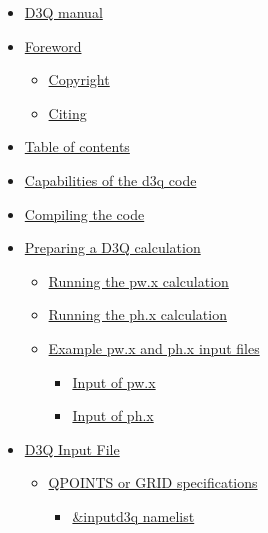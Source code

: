 \documentclass[
]{article}
\providecommand{\tightlist}{%
  \setlength{\itemsep}{0pt}\setlength{\parskip}{0pt}}
\begin{document}
\begin{itemize}
\tightlist
\item
  \protect\hyperlink{d3q-manual}{D3Q manual}
\item
  \protect\hyperlink{foreword}{Foreword}

  \begin{itemize}
  \tightlist
  \item
    \protect\hyperlink{copyright}{Copyright}
  \item
    \protect\hyperlink{citing}{Citing}
  \end{itemize}
\item
  \protect\hyperlink{table-of-contents}{Table of contents}
\item
  \protect\hyperlink{capabilities-of-the-d3q-code}{Capabilities of the
  d3q code}
\item
  \protect\hyperlink{compiling-the-code}{Compiling the code}
\item
  \protect\hyperlink{preparing-a-d3q-calculation}{Preparing a D3Q
  calculation}

  \begin{itemize}
  \tightlist
  \item
    \protect\hyperlink{running-the-pwx-calculation}{Running the pw.x
    calculation}
  \item
    \protect\hyperlink{running-the-phx-calculation}{Running the ph.x
    calculation}
  \item
    \protect\hyperlink{example-pwx-and-phx-input-files}{Example pw.x and
    ph.x input files}

    \begin{itemize}
    \tightlist
    \item
      \protect\hyperlink{input-of-pwx}{Input of pw.x}
    \item
      \protect\hyperlink{input-of-phx}{Input of ph.x}
    \end{itemize}
  \end{itemize}
\item
  \protect\hyperlink{d3q-input-file}{D3Q Input File}

  \begin{itemize}
  \tightlist
  \item
    \protect\hyperlink{qpoints-or-grid-specifications}{QPOINTS or GRID
    specifications}

    \begin{itemize}
    \tightlist
    \item
      \protect\hyperlink{inputd3q-namelist}{\&inputd3q namelist}


\end{itemize}
\end{itemize}
\end{itemize}
\end{document}
